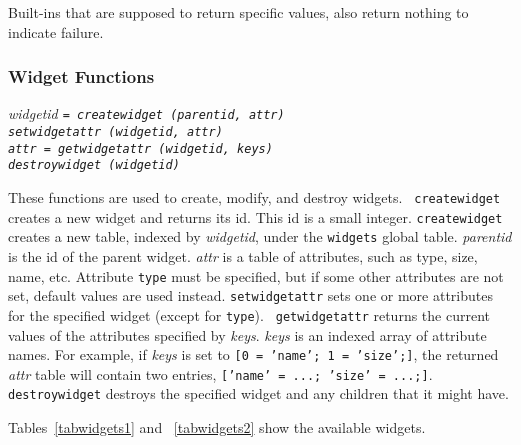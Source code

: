 \noindent
Built-ins that are supposed to return specific values, also
return nothing to indicate failure.

\subsubsection{Widget Functions}

\begin{flushleft}
\it widgetid \tt = createwidget (\it parentid, attr\tt )\\
\tt setwidgetattr (\it widgetid, attr\tt )\\
\it attr \tt = getwidgetattr (\it widgetid, keys\tt )\\
\tt destroywidget (\it widgetid\tt )\\
\end{flushleft}\vspace{-2\itemsep}
These functions are used to create, modify, and destroy widgets.  {\tt
createwidget} creates a new widget and returns its id. This id is a small
integer. {\tt createwidget} creates a new table, indexed by {\it widgetid},
under the {\tt widgets} global table. {\it parentid} is the id of the parent
widget. {\it attr} is a table of attributes, such as type, size, name, etc.
Attribute {\tt type} must be specified, but if some other attributes are not
set, default values are used instead. {\tt setwidgetattr} sets one or more
attributes for the specified widget (except for {\tt type}). {\tt
getwidgetattr} returns the current values of the attributes specified by {\it
keys}.  {\it keys} is an indexed array of attribute names. For example, if {\it
keys} is set to {\tt [0 = 'name'; 1 = 'size';]}, the returned {\it attr} table
will contain two entries, {\tt ['name' = ...; 'size' = ...;]}. {\tt
destroywidget} destroys the specified widget and any children that it might
have.

Tables~\ref{tabwidgets1} and ~\ref{tabwidgets2} show the available widgets.

